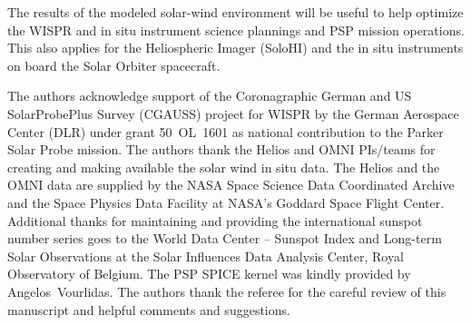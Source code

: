 \documentclass[]{aa}
\begin{document}
        The results of the modeled solar-wind environment will be useful to help optimize the WISPR and in situ instrument science plannings and PSP mission operations. This also applies for the Heliospheric Imager (SoloHI) \citep{Howard2013} and the in situ instruments on board the Solar Orbiter spacecraft.

        \begin{acknowledgements}
                The authors acknowledge support of the Coronagraphic German and US SolarProbePlus Survey (CGAUSS) project for WISPR by the German Aerospace Center (DLR) under grant 50~OL~1601 as national contribution to the Parker Solar Probe mission. The authors thank the Helios and OMNI PIs/teams for creating and making available the solar wind in situ data. The Helios and the OMNI data are supplied by the NASA Space Science Data Coordinated Archive and the Space Physics Data Facility at NASA's Goddard Space Flight Center. Additional thanks for maintaining and providing the international sunspot number series goes to the World Data Center -- Sunspot Index and Long-term Solar Observations at the Solar Influences Data Analysis Center, Royal Observatory of Belgium. The PSP SPICE kernel was kindly provided by Angelos~Vourlidas. The authors thank the referee for the careful review of this manuscript and helpful comments and suggestions.
        \end{acknowledgements}

        
        
\end{document}
